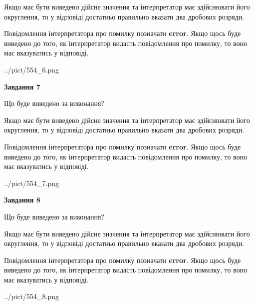 \documentclass[12pt, ukrainian]{article}
\begin{document}
{\begin {Large}
Якщо має бути виведено дійсне значення та інтерпретатор має здійснювати його округлення, 
то у відповіді достатньо правильно вказати два дробових розряди.

Повідомлення інтерпретатора про помилку позначати \textbf{error}.
Якщо щось буде виведено до того, як інтерпретатор видасть повідомлення про помилку, 
то воно має вказуватись у відповіді. \par

\begin{center}
	{../pict/554_6.png}
\end{center}
\newpage

{\begin {center}\textbf{Завдання 7}\end {center}}\par
Що буде виведено за виконання? \par

Якщо має бути виведено дійсне значення та інтерпретатор має здійснювати його округлення, 
то у відповіді достатньо правильно вказати два дробових розряди.

Повідомлення інтерпретатора про помилку позначати \textbf{error}.
Якщо щось буде виведено до того, як інтерпретатор видасть повідомлення про помилку, 
то воно має вказуватись у відповіді. \par

\begin{center}
	{../pict/554_7.png}
\end{center}
\newpage

{\begin {center}\textbf{Завдання 8}\end {center}}\par
Що буде виведено за виконання? \par

Якщо має бути виведено дійсне значення та інтерпретатор має здійснювати його округлення, 
то у відповіді достатньо правильно вказати два дробових розряди.

Повідомлення інтерпретатора про помилку позначати \textbf{error}.
Якщо щось буде виведено до того, як інтерпретатор видасть повідомлення про помилку, 
то воно має вказуватись у відповіді. \par

\begin{center}
	{../pict/554_8.png}
\end{center}
\newpage


\end{Large}}
\end{document}
